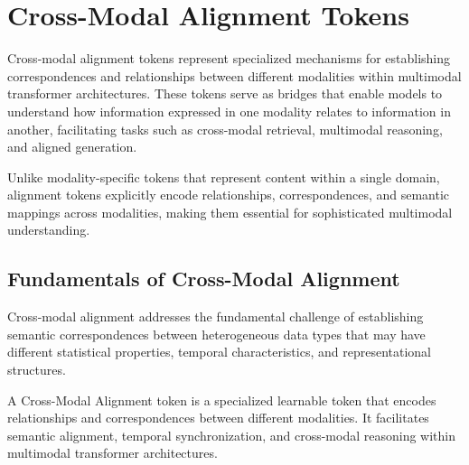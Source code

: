 
\section{Cross-Modal Alignment Tokens}

Cross-modal alignment tokens represent specialized mechanisms for establishing correspondences and relationships between different modalities within multimodal transformer architectures. These tokens serve as bridges that enable models to understand how information expressed in one modality relates to information in another, facilitating tasks such as cross-modal retrieval, multimodal reasoning, and aligned generation.

Unlike modality-specific tokens that represent content within a single domain, alignment tokens explicitly encode relationships, correspondences, and semantic mappings across modalities, making them essential for sophisticated multimodal understanding.

\subsection{Fundamentals of Cross-Modal Alignment}

Cross-modal alignment addresses the fundamental challenge of establishing semantic correspondences between heterogeneous data types that may have different statistical properties, temporal characteristics, and representational structures.

\begin{definition}
A Cross-Modal Alignment token is a specialized learnable token that encodes relationships and correspondences between different modalities. It facilitates semantic alignment, temporal synchronization, and cross-modal reasoning within multimodal transformer architectures.
\end{definition}

